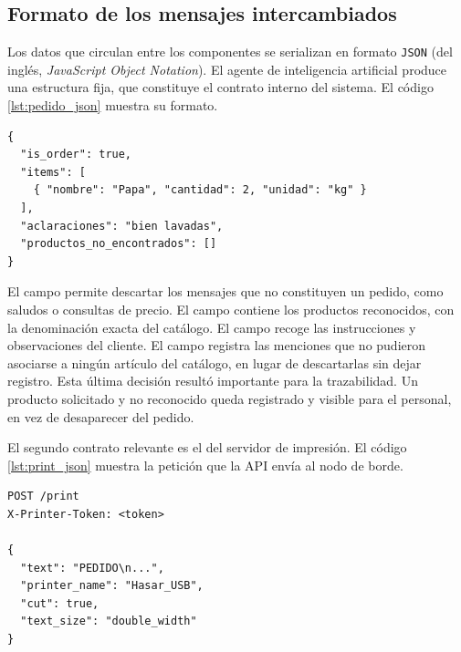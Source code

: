 \subsection{Formato de los mensajes intercambiados}
\label{subsec:payloads}

Los datos que circulan entre los componentes se serializan en formato \texttt{JSON} (del inglés, \textit{JavaScript Object Notation}). El agente de inteligencia artificial produce una estructura fija, que constituye el contrato interno del sistema. El código \ref{lst:pedido_json} muestra su formato.

\noindent
\begin{minipage}{\linewidth}
  \begin{lstlisting}[caption={Estructura del pedido devuelto por el agente de interpretación.}, label={lst:pedido_json}]
{
  "is_order": true,
  "items": [
    { "nombre": "Papa", "cantidad": 2, "unidad": "kg" }
  ],
  "aclaraciones": "bien lavadas",
  "productos_no_encontrados": []
}
\end{lstlisting}
\end{minipage}

El campo  permite descartar los mensajes que no constituyen un pedido, como saludos o consultas de precio. El campo  contiene los productos reconocidos, con la denominación exacta del catálogo. El campo  recoge las instrucciones y observaciones del cliente. El campo  registra las menciones que no pudieron asociarse a ningún artículo del catálogo, en lugar de descartarlas sin dejar registro. Esta última decisión resultó importante para la trazabilidad. Un producto solicitado y no reconocido queda registrado y visible para el personal, en vez de desaparecer del pedido.

El segundo contrato relevante es el del servidor de impresión. El código \ref{lst:print_json} muestra la petición que la API envía al nodo de borde.

\noindent
\begin{minipage}{\linewidth}
  \begin{lstlisting}[caption={Petición de impresión enviada al servidor local.}, label={lst:print_json}]
POST /print
X-Printer-Token: <token>

{
  "text": "PEDIDO\n...",
  "printer_name": "Hasar_USB",
  "cut": true,
  "text_size": "double_width"
}
\end{lstlisting}
\end{minipage}

